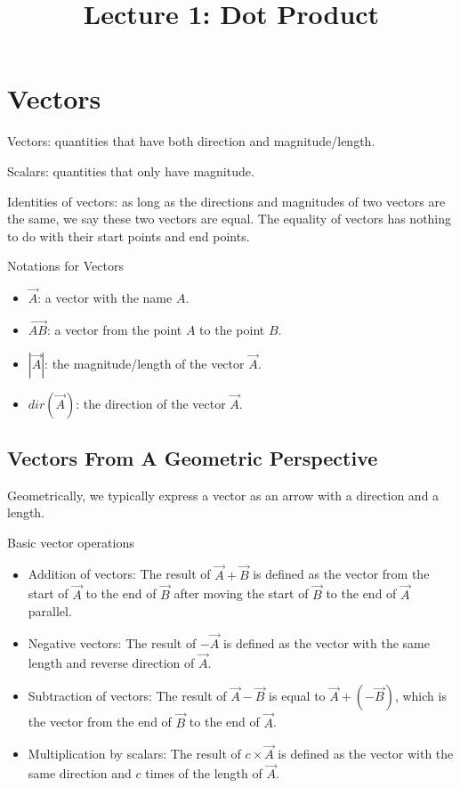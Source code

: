 \documentclass{article}
\title{Lecture 1: Dot Product}
\author{}
\date{}
\begin{document}
\maketitle

\section{Vectors}

Vectors: quantities that have both direction and magnitude/length.

Scalars: quantities that only have magnitude.

Identities of vectors: as long as the directions and magnitudes of two vectors 
are the same, we say these two vectors are equal. The equality of vectors has 
nothing to do with their start points and end points.

\bigskip

Notations for Vectors
\begin{itemize}
    \item $\vec{A}$: a vector with the name $A$.
    \item $\vec{AB}$: a vector from the point $A$ to the point $B$.
    \item $|\vec{A}|$: the magnitude/length of the vector $\vec{A}$.
    \item $dir(\vec{A})$: the direction of the vector $\vec{A}$.
\end{itemize}

\bigskip

\subsection{Vectors From A Geometric Perspective}

Geometrically, we typically express a vector as an arrow with a direction and 
a length.

\smallskip

Basic vector operations
\begin{itemize}
    \item Addition of vectors: The result of $\vec{A} + \vec{B}$ is defined as
    the vector from the start of $\vec{A}$ to the end of $\vec{B}$ after
    moving the start of $\vec{B}$ to the end of $\vec{A}$ parallel.

    \item Negative vectors: The result of $-\vec{A}$ is defined as the vector
    with the same length and reverse direction of $\vec{A}$.

    \item Subtraction of vectors: The result of $\vec{A} - \vec{B}$ is equal to
    $\vec{A} + (-\vec{B})$, which is the vector from the end of $\vec{B}$ to
    the end of $\vec{A}$.

    \item Multiplication by scalars: The result of $c \times \vec{A}$ is
    defined as the vector with the same direction and $c$ times of the length
    of $\vec{A}$. 
\end{itemize}
\end{document}
